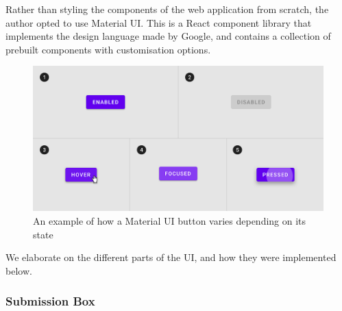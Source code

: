 \par\null\par
\noindent Rather than styling the components of the web application from scratch, the author opted to use Material UI. This is a React component library that implements the design language made by Google, and contains a collection of prebuilt components with customisation options.

\begin{figure}[H]
    \centering
    \includegraphics[scale=0.3]{./images/materialUIbutton.png}
    \caption{An example of how a Material UI button varies depending on its state}
\end{figure}

\par\null\par
\noindent We elaborate on the different parts of the UI, and how they were implemented below.

\subsubsection{Submission Box}